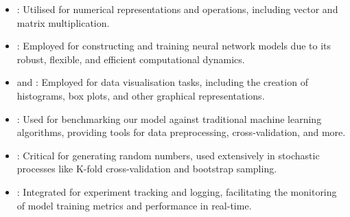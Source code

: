 \documentclass[12pt]{article}
\begin{document}
\begin{itemize}
\setlength\itemsep{-0.3em}
  \item {}: Utilised for numerical representations and operations, including vector and matrix multiplication.
  \item {}: Employed for constructing and training neural network models due to its robust, flexible, and efficient computational dynamics.
  \item {} and : Employed for data visualisation tasks, including the creation of histograms, box plots, and other graphical representations.
  \item {}: Used for benchmarking our model against traditional machine learning algorithms, providing tools for data preprocessing, cross-validation, and more.
  \item {}: Critical for generating random numbers, used extensively in stochastic processes like K-fold cross-validation and bootstrap sampling.
  \item {}: Integrated for experiment tracking and logging, facilitating the monitoring of model training metrics and performance in real-time.
\end{itemize}
\end{document}
